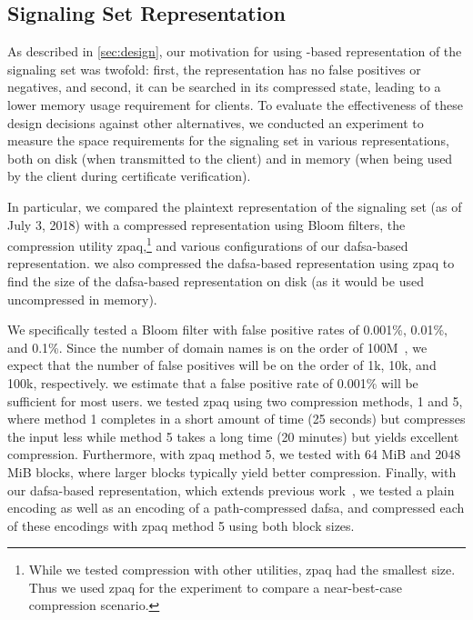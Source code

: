 \subsection{Signaling Set Representation}
\label{sec:evaluation:implementation}

As described in \autoref{sec:design}, our motivation for using -based
representation of the signaling set was twofold: first, the representation has
no false positives or negatives, and second, it can be searched in its
compressed state, leading to a lower memory usage requirement for clients. To
evaluate the effectiveness of these design decisions against other alternatives,
we conducted an experiment to measure the space requirements for the signaling
set in various representations, both on disk (when transmitted to the client)
and in memory (when being used by the client during certificate verification).

In particular, we compared the plaintext representation of the signaling set (as
of July 3, 2018) with a compressed representation using Bloom filters, the
compression utility zpaq,\footnote{While we tested compression with other
  utilities, zpaq had the smallest size. Thus we used zpaq for the experiment to
  compare a near-best-case compression scenario.} and various configurations of
our \ac{dafsa}-based representation. we also compressed the \ac{dafsa}-based
representation using zpaq to find the size of the \ac{dafsa}-based
representation on disk (as it would be used uncompressed in memory).

We specifically tested a Bloom filter with false positive rates of 0.001\%,
0.01\%, and 0.1\%. Since the number of domain names is on the order of
100M~\cite{dnib-14-1}, we expect that the number of false positives will be on
the order of 1k, 10k, and 100k, respectively. we estimate that a false positive
rate of 0.001\% will be sufficient for most users. we tested zpaq using two
compression methods, 1 and 5, where method 1 completes in a short amount of time
(25 seconds) but compresses the input less while method 5 takes a long time (20
minutes) but yields excellent compression. Furthermore, with zpaq method 5, we
tested with 64 MiB and 2048 MiB blocks, where larger blocks typically yield
better compression. Finally, with our \ac{dafsa}-based representation, which
extends previous work~\cite{daciuk2012smaller}, we tested a plain encoding as
well as an encoding of a path-compressed \ac{dafsa}, and compressed each of
these encodings with zpaq method 5 using both block sizes.

